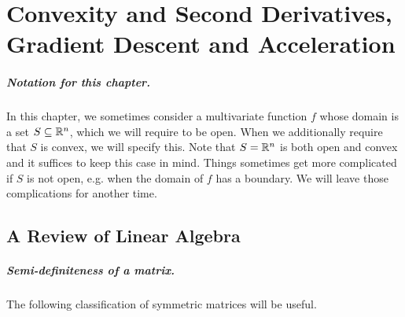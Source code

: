 \chapter{Convexity and Second Derivatives,
  Gradient Descent and Acceleration}
\label{sec:gd}


%
\sloppy

%
%



\paragraph{Notation for this chapter.}
  In this chapter, we sometimes consider a multivariate function $f$
  whose domain is a set $S \subseteq \mathbb{R}^n$, which we will require to
  be open.
  When we additionally require that $S$ is convex, we will specify this.
  Note that $S = \mathbb{R}^n$ is both open and convex and it suffices to keep
  this case in mind.
  Things sometimes get more complicated if $S$ is not open, e.g. when the
  domain of $f$ has a boundary.
  We will leave those complications for another time.

\section{A Review of Linear Algebra}
\paragraph{Semi-definiteness of a matrix.}  The following classification of symmetric matrices will be useful.

